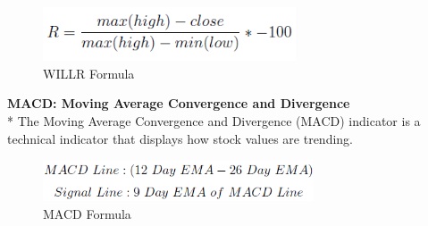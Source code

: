 \documentclass[]{article}
\begin{document}
\begin{figure}[H]
\begin{center}
    \includegraphics[width=75mm,scale=0.8]{assets/formulas/willr.png}
    \caption{WILLR Formula}
\end{center}
\end{figure}
\noindent
\textbf{MACD: Moving Average Convergence and Divergence} \\*
The Moving Average Convergence and Divergence (MACD) indicator is a technical indicator that displays how stock values are trending.
\begin{figure}[H]
\begin{center}
    \includegraphics[width=80mm,scale=0.8]{assets/formulas/macd.png}
    \caption{MACD Formula}
\end{center}
\end{figure}
\end{document}
